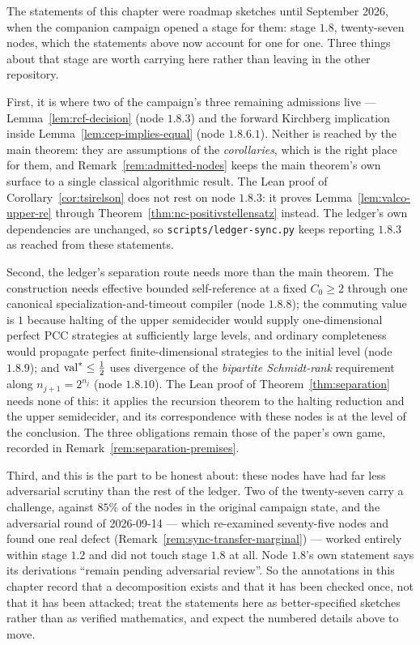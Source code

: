 \begin{remark}
\label{rem:downstream-nodes}
The statements of this chapter were roadmap sketches until September 2026, when the companion
campaign opened a stage for them: stage $1.8$, twenty-seven nodes, which the statements above
now account for one for one. Three things about that stage are worth carrying here rather than
leaving in the other repository.

First, it is where two of the campaign's three remaining admissions live ---
Lemma~\ref{lem:rcf-decision} (node $1.8.3$) and the forward Kirchberg implication inside
Lemma~\ref{lem:cep-implies-equal} (node $1.8.6.1$). Neither is reached by the main theorem:
they are assumptions of the \emph{corollaries}, which is the right place for them, and
Remark~\ref{rem:admitted-nodes} keeps the main theorem's own surface to a single classical
algorithmic result. The Lean proof of Corollary~\ref{cor:tsirelson} does not rest on node
$1.8.3$: it proves Lemma~\ref{lem:valco-upper-re} through
Theorem~\ref{thm:nc-positivstellensatz} instead. The ledger's own dependencies are unchanged,
so \texttt{scripts/ledger-sync.py} keeps reporting $1.8.3$ as reached from these statements.

Second, the ledger's separation route needs more than the main theorem. The construction needs
effective bounded self-reference at a fixed $C_0 \geq 2$ through one canonical
specialization-and-timeout compiler (node $1.8.8$); the commuting value is $1$ because halting
of the upper semidecider would supply one-dimensional perfect PCC strategies at sufficiently
large levels, and ordinary completeness would propagate perfect finite-dimensional strategies
to the initial level (node $1.8.9$); and $\mathrm{val}^*\leq\frac12$ uses divergence of the
\emph{bipartite Schmidt-rank} requirement along $n_{j+1}=2^{n_j}$ (node $1.8.10$). The Lean
proof of Theorem~\ref{thm:separation} needs none of this: it applies the recursion theorem to
the halting reduction and the upper semidecider, and its correspondence with these nodes is at
the level of the conclusion. The three obligations remain those of the paper's own game,
recorded in Remark~\ref{rem:separation-premises}.

Third, and this is the part to be honest about: these nodes have had far less adversarial
scrutiny than the rest of the ledger. Two of the twenty-seven carry a challenge, against $85\%$
of the nodes in the original campaign state, and the adversarial round of 2026-09-14 --- which
re-examined seventy-five nodes and found one real defect
(Remark~\ref{rem:sync-transfer-marginal}) --- worked entirely within stage $1.2$ and did not
touch stage $1.8$ at all. Node $1.8$'s own statement says its derivations ``remain pending
adversarial review''. So the annotations in this chapter record that a decomposition exists and
that it has been checked once, not that it has been attacked; treat the statements here as
better-specified sketches rather than as verified mathematics, and expect the numbered details
above to move.
\end{remark}
